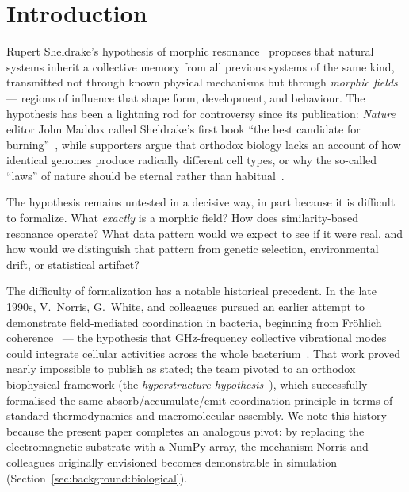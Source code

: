 \documentclass[twoside,11pt]{article}
\begin{document}
\section{Introduction}
\label{sec:intro}

Rupert Sheldrake's hypothesis of morphic resonance~\citep{sheldrake1981,
sheldrake1988} proposes that natural systems inherit a collective memory from
all previous systems of the same kind, transmitted not through known physical
mechanisms but through \emph{morphic fields} --- regions of influence that
shape form, development, and behaviour.  The hypothesis has been a lightning
rod for controversy since its publication: \emph{Nature} editor John Maddox
called Sheldrake's first book ``the best candidate for
burning''~\citep{maddox1981}, while supporters argue that orthodox biology
lacks an account of how identical genomes produce radically different cell
types, or why the so-called ``laws'' of nature should be eternal rather than
habitual~\citep{sheldrake2012}.

The hypothesis remains untested in a decisive way, in part because it is
difficult to formalize.  What \emph{exactly} is a morphic field?  How does
similarity-based resonance operate?  What data pattern would we expect to see
if it were real, and how would we distinguish that pattern from genetic
selection, environmental drift, or statistical artifact?

The difficulty of formalization has a notable historical precedent.  In the
late 1990s, V.~Norris, G.~White, and colleagues pursued an earlier attempt to
demonstrate field-mediated coordination in bacteria, beginning from Fröhlich
coherence~\citep{frohlich1968longrange} --- the hypothesis that GHz-frequency
collective vibrational modes could integrate cellular activities across
the whole bacterium~\citep{norris1997sing}.  That work proved nearly
impossible to publish as stated; the team pivoted to an orthodox biophysical
framework (the \emph{hyperstructure hypothesis}~\citep{norris1999}), which
successfully formalised the same absorb/accumulate/emit coordination principle
in terms of standard thermodynamics and macromolecular assembly.  We note
this history because the present paper completes an analogous pivot: by
replacing the electromagnetic substrate with a NumPy array, the mechanism
Norris and colleagues originally envisioned becomes demonstrable in
simulation (Section~\ref{sec:background:biological}).
\end{document}
